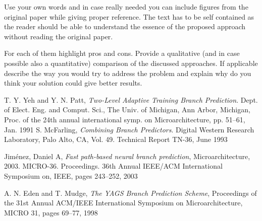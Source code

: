 \documentclass[conference]{IEEEtran}
\begin{document}



Use your own words and in case really needed you can include figures from the original paper while giving proper reference.
The text has to be self contained as the reader should be able to understand the essence of the proposed approach without reading the original paper.






For each of them highlight pros and cons.
Provide a qualitative (and in case possible also a quantitative) comparison of the discussed approaches.
If applicable describe the way you would try to address the problem and explain why do you think your solution could give better results.






%
%
%
\begin{thebibliography}{5}

T. Y. Yeh and Y. N. Patt, \emph{Two-Level Adaptive Training Branch Prediction}. Dept. of Elect. Eng. and Comput. Sci., The Univ. of Michigan, Ann Arbor, Michigan, Proc. of the 24th annual international symp. on Microarchitecture, pp. 51–61, Jan. 1991
S. McFarling, \emph{Combining Branch Predictors}. Digital Western Research Laboratory, Palo Alto, CA, Vol. 49. Technical Report TN-36, June 1993 

Jiménez, Daniel A, \emph{Fast path-based neural branch prediction}, Microarchitecture, 2003. MICRO-36. Proceedings. 36th Annual IEEE/ACM International Symposium on, IEEE, pages 243--252, 2003

A. N. Eden and T. Mudge, \emph{The YAGS Branch Prediction Scheme}, Proceedings of the 31st Annual ACM/IEEE International Symposium on Microarchitecture, MICRO 31, pages 69--77, 1998

\end{thebibliography}




\end{document}
